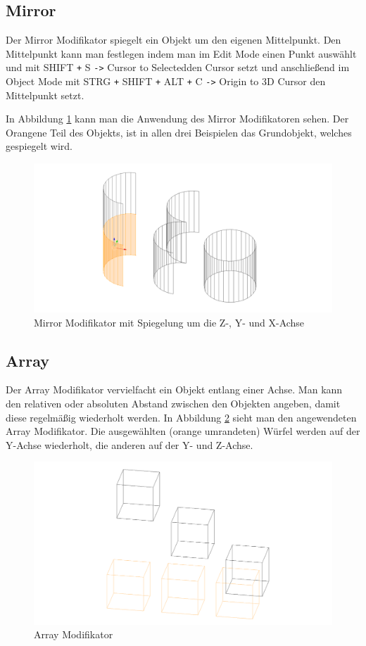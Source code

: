 \subsection{Mirror}\citep{blender:mirror_modifier}
Der Mirror Modifikator spiegelt ein Objekt um den eigenen Mittelpunkt.
Den Mittelpunkt kann man festlegen indem man im Edit Mode einen Punkt auswählt
und mit SHIFT \verb-+- S \verb+->+ \dq Cursor to Selected\dq den Cursor setzt und anschließend im Object Mode mit STRG \verb-+- SHIFT \verb-+- ALT \verb-+- C \verb+->+
Origin to 3D Cursor den Mittelpunkt setzt.

In Abbildung \ref{modifikatoren:image2} kann man die Anwendung des Mirror Modifikatoren sehen. Der Orangene Teil des Objekts, ist in allen drei Beispielen das
Grundobjekt, welches gespiegelt wird.

\begin{figure}[h]
    \centering
    \includegraphics[width=.8\textwidth]{images/Modifikatoren-Mirror.png}
    \caption{Mirror Modifikator mit Spiegelung um die Z-, Y- und X-Achse}
    \label{modifikatoren:image2}
\end{figure}

\subsection{Array}\citep{blender:array_modifier}
Der Array Modifikator vervielfacht ein Objekt entlang einer Achse. Man kann den relativen oder absoluten Abstand zwischen den Objekten
angeben, damit diese regelmäßig wiederholt werden. In Abbildung \ref{modifikatoren:image3} sieht man den angewendeten Array Modifikator.
Die ausgewählten (orange umrandeten) Würfel werden auf der Y-Achse
wiederholt, die anderen auf der Y- und Z-Achse.
\begin{figure}[h]
    \centering
    \includegraphics[width=.8\textwidth]{images/Modifikatoren-Array.png}
    \caption{Array Modifikator}
    \label{modifikatoren:image3}
\end{figure}

